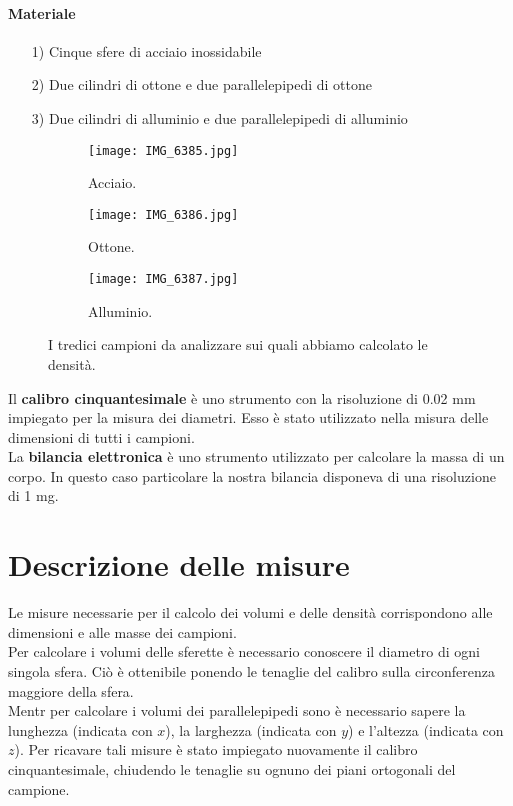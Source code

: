 \documentclass[8pt]{article}
\begin{document}
\paragraph{Materiale}
\begin{itemize}
\item[1)] Cinque sfere di acciaio inossidabile
\item[2)] Due cilindri di ottone e due parallelepipedi di ottone
\item[3)] Due cilindri di alluminio e due parallelepipedi di alluminio
\end{itemize}

\begin{figure}[h!]
  \centering
  \begin{subfigure}[b]{0.3\linewidth}
    \texttt{[image: IMG\_6385.jpg]}
    \caption{Acciaio.}
  \end{subfigure}
  \begin{subfigure}[b]{0.3\linewidth}
    \texttt{[image: IMG\_6386.jpg]}
    \caption{Ottone.}
  \end{subfigure}
\begin{subfigure}[b]{0.3\linewidth}
    \texttt{[image: IMG\_6387.jpg]}
    \caption{Alluminio.}
  \end{subfigure}
  \caption{I tredici campioni da analizzare sui quali abbiamo calcolato le densità.}
  \label{fig:campioni}
\end{figure}

Il \textbf{calibro cinquantesimale} è uno strumento con la risoluzione di 0.02 mm
impiegato per la misura dei diametri. Esso è stato utilizzato nella misura
delle dimensioni di tutti i campioni. \\

La \textbf{bilancia elettronica} è uno strumento utilizzato per calcolare la massa di un corpo.
In questo caso particolare la nostra bilancia disponeva di una risoluzione di 1 mg.

\section{Descrizione delle misure}
Le misure necessarie per il calcolo dei volumi e delle densità corrispondono alle dimensioni e alle masse
dei campioni. \\
Per calcolare i volumi delle sferette è necessario conoscere il diametro di ogni singola sfera.
Ciò è ottenibile ponendo le tenaglie del calibro sulla circonferenza maggiore della sfera. \\
Mentr  per calcolare i volumi dei parallelepipedi sono è necessario sapere la lunghezza 
(indicata con $x$), la larghezza (indicata con $y$) e l'altezza (indicata con $z$). Per ricavare
tali misure è stato impiegato nuovamente il calibro cinquantesimale, chiudendo le tenaglie su ognuno
dei piani ortogonali del campione. \\
\end{document}
